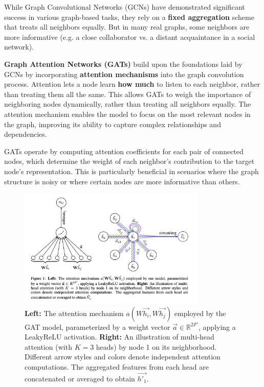 \documentclass{article}
\begin{document}
While Graph Convolutional Networks (GCNs) have demonstrated significant success in various graph-based tasks, they rely on a \textbf{fixed aggregation} scheme that treats all neighbors equally.
But in many real graphs, some neighbors are more informative (e.g. a close collaborator vs. a distant acquaintance in a social network).

\textbf{Graph Attention Networks (GATs)} build upon the foundations laid by GCNs by incorporating \textbf{attention mechanisms} into the graph convolution process.
Attention lets a node learn \textbf{how much} to listen to each neighbor, rather than treating them all the same.
This allows GATs to weigh the importance of neighboring nodes dynamically, rather than treating all neighbors equally.
The attention mechanism enables the model to focus on the most relevant nodes in the graph, improving its ability to capture complex relationships and dependencies.

GATs operate by computing attention coefficients for each pair of connected nodes, which determine the weight of each neighbor's contribution to the target node's representation.
This is particularly beneficial in scenarios where the graph structure is noisy or where certain nodes are more informative than others.

\newpage

\begin{figure}[ht]
      \centering
      \includegraphics[width=0.8\textwidth,trim=0 130 0 0,clip]{../assets/gat_architecture.png}
      \caption{\textbf{Left:} The attention mechanism $a(W\vec{h_i}, W\vec{h_j})$ employed by the GAT model, parameterized by a weight vector $\vec{a} \in \mathbb{R}^{2F'}$, applying a LeakyReLU activation. \textbf{Right:} An illustration of multi-head attention (with $K = 3$ heads) by node 1 on its neighborhood. Different arrow styles and colors denote independent attention computations. The aggregated features from each head are concatenated or averaged to obtain $\vec{h'_1}$.}
      \label{fig:gat-architecture}
\end{figure}
\end{document}
